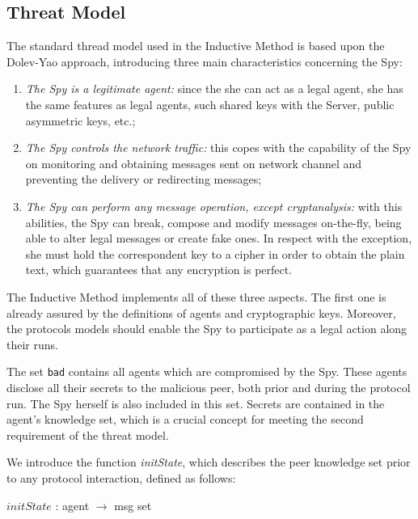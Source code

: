 \subsection{Threat Model}
The standard thread model used in the Inductive Method is based upon the Dolev-Yao \cite{dolev-yao} approach, introducing three main characteristics concerning the Spy:

\begin{enumerate}
  \item \textit{The Spy is a legitimate agent:} since the she can act as a legal agent, she has the same features as legal agents, such shared keys with the Server, public asymmetric keys, etc.;

  \item \textit{The Spy controls the network traffic:} this copes with the capability of the Spy on monitoring and obtaining messages sent on network channel and  preventing the delivery or redirecting messages;

  \item \textit{The Spy can perform any message operation, except cryptanalysis:} with this abilities, the Spy can break, compose and modify messages on-the-fly, being able to alter legal messages or create fake ones. In respect with the exception, she must hold the correspondent key to a cipher in order to obtain the plain text, which guarantees that any encryption is perfect.
\end{enumerate}

The Inductive Method implements all of these three aspects. The first one is already assured by the definitions of agents and cryptographic keys. Moreover, the protocols models should enable the Spy to participate as a legal action along their runs.

The set \texttt{bad} contains all agents which are compromised by the Spy. These agents disclose all their secrets to the malicious peer, both prior and during the protocol run. The Spy herself is also included in this set. Secrets are contained in the agent's knowledge set, which is a crucial concept for meeting the second requirement of the threat model.

We introduce the function \textit{initState}, which describes the peer knowledge set prior to any protocol interaction, defined as follows:

\begin{center}
  {\ttfamily $initState$ : agent $\longrightarrow$ msg set}
\end{center}

